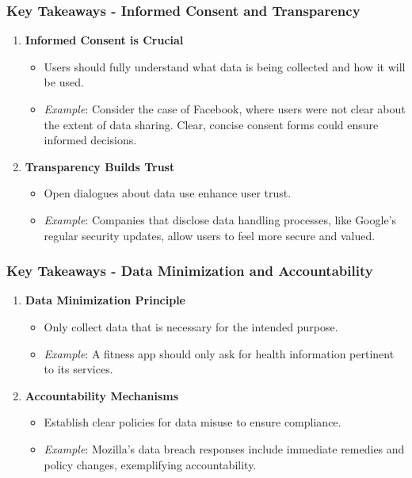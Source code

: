 \documentclass[aspectratio=169]{beamer}
\begin{document}
\begin{frame}[fragile]
    \frametitle{Key Takeaways - Informed Consent and Transparency}
    \begin{enumerate}
        \item \textbf{Informed Consent is Crucial}
        \begin{itemize}
            \item Users should fully understand what data is being collected and how it will be used.
            \item \textit{Example}: Consider the case of Facebook, where users were not clear about the extent of data sharing. Clear, concise consent forms could ensure informed decisions.
        \end{itemize}
        
        \item \textbf{Transparency Builds Trust}
        \begin{itemize}
            \item Open dialogues about data use enhance user trust.
            \item \textit{Example}: Companies that disclose data handling processes, like Google’s regular security updates, allow users to feel more secure and valued.
        \end{itemize}
    \end{enumerate}
\end{frame}

\begin{frame}[fragile]
    \frametitle{Key Takeaways - Data Minimization and Accountability}
    \begin{enumerate}
        \item \textbf{Data Minimization Principle}
        \begin{itemize}
            \item Only collect data that is necessary for the intended purpose.
            \item \textit{Example}: A fitness app should only ask for health information pertinent to its services.
        \end{itemize}
        
        \item \textbf{Accountability Mechanisms}
        \begin{itemize}
            \item Establish clear policies for data misuse to ensure compliance.
            \item \textit{Example}: Mozilla’s data breach responses include immediate remedies and policy changes, exemplifying accountability.
        \end{itemize}
    \end{enumerate}
\end{frame}
\end{document}
